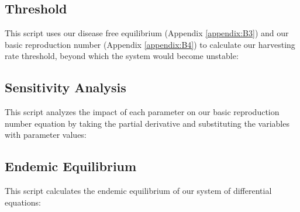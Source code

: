 \documentclass[12pt]{article}
\begin{document}
        \subsection{Threshold}
        \label{appendix:B5}
        This script uses our disease free equilibrium (Appendix \ref{appendix:B3}) and our basic reproduction number (Appendix \ref{appendix:B4}) to calculate our harvesting rate threshold, beyond which the system would become unstable:
        \begin{center}
            
        \end{center}
        
        \subsection{Sensitivity Analysis}
        This script analyzes the impact of each parameter on our basic reproduction number equation by taking the partial derivative and substituting the variables with parameter values:
        \label{appendix:B6}
        \begin{center}
            
        \end{center}
        
        \subsection{Endemic Equilibrium}
        \label{appendix:B7}
        This script calculates the endemic equilibrium of our system of differential equations:        
        \begin{center}
            
        \end{center}
\newpage
% 
% 
\printbibliography
\end{document}
